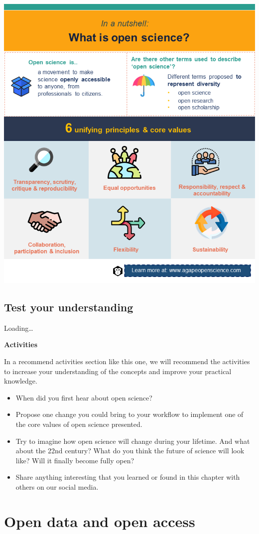\documentclass[
]{book}
\begin{document}
\begin{center}\includegraphics[width=0.7\linewidth]{images/slide01} \end{center}

\hypertarget{test-your-understanding}{%
\section{Test your understanding}\label{test-your-understanding}}

Loading\ldots{}

\textbf{Activities}

In a recommend activities section like this one, we will recommend the activities to increase your understanding of the concepts and improve your practical knowledge.

\begin{itemize}
\item
  When did you first hear about open science?
\item
  Propose one change you could bring to your workflow to implement one of the core values of open science presented.
\item
  Try to imagine how open science will change during your lifetime. And what about the 22nd century? What do you think the future of science will look like? Will it finally become fully open?
\item
  Share anything interesting that you learned or found in this chapter with others on our social media.
\end{itemize}

\hypertarget{open-data-and-open-access}{%
\chapter{Open data and open access}\label{open-data-and-open-access}}
\end{document}
